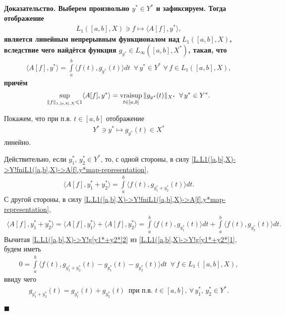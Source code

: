 \documentclass{report}
\newenvironment{Proof}{\par\noindent\bf Доказательство.\rm}{ $\blacksquare$\par}
\newcommand{\vraisup}{\mathop{\rm vraisup}}
\begin{document}
\begin{Proof}
Выберем произвольно $y^*\in Y^*$ и зафиксируем. Тогда отображение
\begin{gather}\label{L.L1([a,b],X)->Y!fniL1([a,b],X)->A[f].y*map}
L_1([a,b],X)\ni f\mapsto \langle A[f],y^*\rangle,
\end{gather}
является линейным непрерывным функционалом над $L_1([a,b],X)$, вследствие чего найдётся функция $g_{y^*}\in L_\infty([a,b],X^*)$, такая, что
\begin{gather}\label{L.L1([a,b],X)->Y!fniL1([a,b],X)->A[f].y*map-representation}
\langle A[f],y^*\rangle=\int\limits_a^b\langle f(t),g_{y^*}(t)\rangle dt\,\,\,\forall\,y^*\in Y^*\,\,\forall\,f\in L_1([a,b],X),
\end{gather}
причём
\begin{gather}\label{L.L1([a,b],X)->Y!fniL1([a,b],X)->A[f].y*map-norm}
\sup\limits_{\|f\|_{1,[a,b],X}\leqslant1}\langle A[f],y^*\rangle=\vraisup\limits_{t\in[a,b]}\|g_{y^*}(t)\|_{X^*}\,\,\,\forall\,y^*\in Y^*.
\end{gather}

Покажем, что при п.в. $t\in[a,b]$ отображение
\begin{gather}\label{L.L1([a,b],X)->Y!g[cdot](t)map}
Y^*\ni y^*\mapsto g_{y^*}(t)\in X^*
\end{gather}
линейно.

Действительно, если $y_1^*$, $y_2^*\in Y^*$, то, с одной стороны, в силу \eqref{L.L1([a,b],X)->Y!fniL1([a,b],X)->A[f].y*map-representation},
\begin{gather}\label{L.L1([a,b],X)->Y!g[y1*+y2*]1}
\langle A[f],y^*_1+y^*_2\rangle=\int\limits_a^b\langle f(t),g_{y^*_1+y^*_2}(t)\rangle dt.
\end{gather}
С другой стороны, в силу \eqref{L.L1([a,b],X)->Y!fniL1([a,b],X)->A[f].y*map-representation},
\begin{gather}\label{L.L1([a,b],X)->Y!g[y1*+y2*]2}
\langle A[f],y^*_1+y^*_2\rangle=\langle A[f],y^*_1\rangle+\langle A[f],y^*_2\rangle=\int\limits_a^b\langle f(t),g_{y^*_1}(t)\rangle dt+\int\limits_a^b\langle f(t),g_{y^*_2}(t)\rangle dt.
\end{gather}
Вычитая \eqref{L.L1([a,b],X)->Y!g[y1*+y2*]2} из \eqref{L.L1([a,b],X)->Y!g[y1*+y2*]1}, будем иметь
\begin{gather*}
0=\int\limits_a^b\langle f(t),g_{y^*_1+y^*_2}(t)-g_{y^*_1}(t)-g_{y^*_2}(t)\rangle dt\,\,\,\forall\,f\in L_1([a,b],X),
\end{gather*}
ввиду чего
\begin{gather}\label{L.L1([a,b],X)->Y!g[y1*+y2*]=g[y1*]+g[y2*]}
g_{y^*_1+y^*_2}(t)=g_{y^*_1}(t)+g_{y^*_2}(t)\,\,\,\text{при п.в. $t\in[a,b]$, }\forall\,y^*_1,\,y_2^*\in Y^*.
\end{gather}


\end{Proof}
\end{document}
